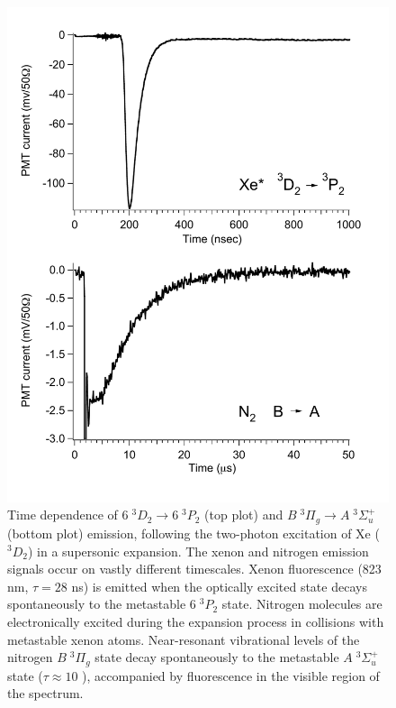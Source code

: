 \begin{figure}
  \caption{Time dependence of  $6\;^3D_2 \rightarrow 6\;^3P_2$
    (top plot) and  $B \; ^3\Pi_g \rightarrow A \; ^3\Sigma_u^+$ (bottom
    plot) emission, following the two-photon excitation of Xe
    ($^3D_2$) in a supersonic expansion.  The xenon and nitrogen
    emission signals occur on vastly different timescales.  Xenon
    fluorescence (823 nm, $\tau=28$ ns) is emitted when the optically
    excited state decays spontaneously to the metastable $6\;^3P_2$
    state.  Nitrogen molecules are electronically excited during the
    expansion process in collisions with metastable xenon atoms.
    Near-resonant vibrational levels of the nitrogen $B \; ^3\Pi_g$
    state decay spontaneously to the metastable $A \; ^3\Sigma_u^+$
    state ($\tau \approx 10$ \microsec), accompanied by fluorescence
    in the visible region of the spectrum.}
  \label{fig:xen2-traces}
  \centering
  \includegraphics[width=5.5in]{xen2-timescales.pdf}
\end{figure}


